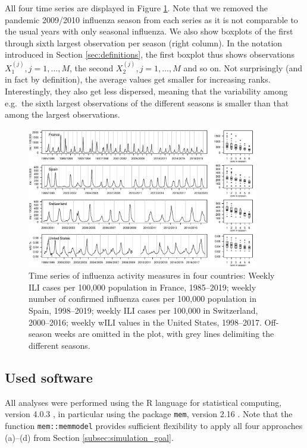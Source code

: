 \documentclass{article}
\begin{document}
All four time series are displayed in Figure \ref{fig:data}. Note that we removed the pandemic 2009/2010 influenza season from each series as it is not comparable to the usual years with only seasonal influenza. We also show boxplots of the first through sixth largest observation per season (right column). In the notation introduced in Section \ref{sec:definitions}, the first boxplot thus shows observations $X_1^{(j)}, j = 1, \dots, M$, the second $X_2^{(j)}, j = 1, \dots, M$ and so on. Not surprisingly (and in fact by definition), the average values get smaller for increasing ranks. Interestingly, they also get less dispersed, meaning that the variability among e.g.\ the sixth largest observations of the different seasons is smaller than that among the largest observations. 


\begin{figure}[h]
\center
\includegraphics[width=0.9\textwidth]{figure/plot_data.pdf}
\caption{Time series of influenza activity measures in four countries: Weekly ILI cases per 100,000 population in France, 1985--2019; weekly number of confirmed influenza cases per 100,000 population in Spain, 1998--2019; weekly ILI cases per 100,000 in Switzerland, 2000--2016; weekly wILI values in the United States, 1998--2017. Off-season weeks are omitted in the plot, with grey lines delimiting the different seasons.}
\label{fig:data}
\end{figure}

\subsection{Used software}

All analyses were performed using the R language for statistical computing, version 4.0.3 \citep{RCT2020}, in particular using the package \texttt{mem}, version 2.16 \citep{Lozano2020}. Note that the function \texttt{mem::memmodel} provides sufficient flexibility to apply all four approaches (a)--(d) from Section \ref{subsec:simulation_goal}.
\end{document}
